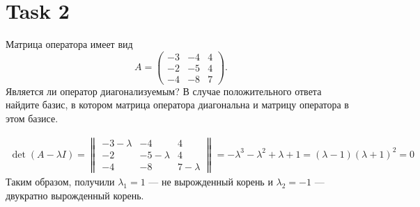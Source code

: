 \section{Task 2}
\begin{task}
    Матрица оператора имеет вид $$A =\begin{pmatrix}-3&-4&4\\-2&-5&4\\-4&-8&7 \end{pmatrix}.$$ Является ли оператор диагонализуемым?  В случае положительного ответа найдите базис, в котором матрица оператора диагональна и матрицу оператора в этом базисе.
\end{task}

\begin{solution}
    \begin{gather}
        \det(A-\lambda I) = 
        \begin{Vmatrix}
            -3-\lambda & -4 & 4 \\
            -2 & -5-\lambda & 4 \\
            -4 & -8 & 7-\lambda
        \end{Vmatrix} = -\lambda^3-\lambda^2+\lambda+1 = (\lambda-1)(\lambda+1)^2 = 0
    \end{gather}
    Таким образом, получили $\lambda_1 = 1$ --- не вырожденный корень и $\lambda_2 = -1$ --- двукратно вырожденный корень.
    

\end{solution}
